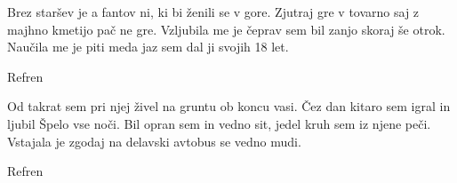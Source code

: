 

    \beginverse\baselineskip=15pt
        Brez staršev je a fantov ni, ki bi ženili se v gore.
        Zjutraj gre v tovarno saj z majhno kmetijo pač ne gre.
        Vzljubila me je čeprav sem bil zanjo skoraj še otrok.
        Naučila me je piti meda jaz sem dal ji svojih 18 let.
    \endverse

    \beginchorus\baselineskip=14pt
        Refren
    \endchorus


    \beginverse\baselineskip=15pt
        Od takrat sem pri njej živel na gruntu ob koncu vasi.
        Čez dan kitaro sem igral in ljubil Špelo vse noči.
        Bil opran sem in vedno sit, jedel kruh sem iz njene peči.
        Vstajala je zgodaj na delavski avtobus se vedno mudi.
    \endverse

    \beginchorus\baselineskip=14pt
        Refren
    \endchorus


\]\]\]\]\]\]\]\]\]\]\]\]\]\]\]\]\]\]\]\]\]\]\]\]\]\]\]\]\]\]\]\]\]\]\]\]\]\]\]\]\]\]\]\]\]\]\]\]\]\]\]\]\]\]\]\]\]\]\]\]\]\]\]\]\]\]\]\]\]\]\]\]\]\]\]\]\]\]\]\]\]\]\]\]\]\]\]\]\]\]\]\]\]\]\]\]\]\]\]\]\]\]\]\]\]\]\]\]\]\]\]\]\]\]\]\]\]\]\]\]\]\]\]\]\]\]\]\]\]\]\]\]\]\]\]\]\]\]\]\]\]\]\]\]\]\]\]\]\]\]\]\]\]\]\]\]\]\]\]\]\]\]\]\]\]\]\]\]\]\]\]\]\]\]\]\]\]\]\]\]\]\]\]\]\]\]\]\]\]\]\]\]\]\]\]\]\]\]\]\]\]\]\]\]\]\]\]\]\]\]\]\]\]\]\]\]\]\]\]\]\]\]\]\]\]\]\]\]\]\]\]\]\]\]\]\]\]\]\]\]\]\]\]\]\]\]\]\]\]\]\]\]\]\]\]\]\]\]\]\]\]\]\]\]\]\]\]\]\]\]\]\]\]\]\]\]\]\]\]\]\]\]\]\]\]\]\]\]\]\]\]\]\]\]\]\]\]\]\]\]\]\]\]\]\]\]\]\]\]\]\]\]\]\]\]\]\]\]\]\]\]\]\]\]\]\]\]\]\]\]\]\]\]\]\]\]\]\]\]\]\]\]\]\]\]\]\]\]\]\]\]\]\]\]\]\]\]\]\]\]\]\]\]\]\]\]\]\]\]\]\]\]\]\]\]\]\]\]\]\]\]\]\]\]\]\]\]\]\]\]\]\]\]\]\]\]\]\]\]\]\]\]\]\]\]\]\]\]\]\]\]\]\]\]\]\]\]\]\]\]\]\]\]\]\]\]\]\]\]\]\]\]\]\]\]\]\]\]\]\]\]\]\]\]\]\]\]\]\]\]\]\]\]\]\]\]\]\]\]\]\]\]\]\]\]\]\]\]\]\]\]\]\]\]\]\]\]\]\]\]\]\]\]\]\]\]\]\]\]\]\]\]\]\]\]\]\]\]\]\]\]\]\]\]\]\]\]\]\]\]\]\]\]\]\]\]\]\]\]\]\]\]\]\]\]\]\]\]\]\]\]\]\]\]\]\]\]\]\]\]\]\]\]\]\]\]\]\]\]\]\]\]\]\]\]\]\]\]\]\]\]\]\]\]\]\]\]\]\]\]\]\]\]\]\]\]\]\]\]\]\]\]\]\]\]\]\]\]\]\]\]\]\]\]\]\]\]\]\]\]\]\]\]\]\]\]\]\]\]\]\]\]\]\]\]\]\]\]\]\]\]\]\]\]\]\]\]\]\]\]\]\]\]\]\]\]\]\]\]\]\]\]\]\]\]\]\]\]\]\]\]\]\]\]\]\]\]\]\]\]\]\]\]\]\]\]\]\]\]\]\]\]\]\]\]\]\]\]\]\]\]\]\]\]\]\]\]\]\]\]\]\]\]\]\]\]\]\]\]\]\]\]\]\]\]\]\]\]\]\]\]\]\]\]\]\]\]\]\]\]\]\]\]\]\]\]\]\]\]\]\]\]\]\]\]\]\]\]\]\]\]\]\]\]\]\]\]\]\]\]\]\]\]\]\]\]\]\]\]\]\]\]\]\]\]\]\]\]\]\]\]\]\]\]\]\]\]\]\]\]\]\]\]\]\]\]\]\]\]\]\]\]\]\]\]\]\]\]\]\]\]\]\]\]\]\]\]\]\]\]\]\]\]\]\]\]\]\]\]\]\]\]\]\]\]\]\]\]\]\]\]\]\]\]\]\]\]\]\]\]\]\]\]\]\]\]\]\]\]\]\]\]\]\]\]\]\]\]\]\]\]\]\]\]\]\]\]\]\]\]\]\]\]\]\]\]\]\]\]\]\]\]\]\]\]\]\]\]\]\]\]\]\]\]\]\]\]\]\]\]\]\]\]\]\]\]\]\]\]\]\]\]\]\]\]\]\]\]\]\]\]\]\]\]\]\]\]\]\]\]\]\]\]\]\]\]\]\]\]\]\]\]\]\]\]\]\]\]\]\]\]\]\]\]\]\]\]\]\]\]\]\]\]\]\]\]\]\]\]\]\]\]\]\]\]\]\]\]\]\]\]\]\]\]\]\]\]\]\]\]\]\]\]\]\]\]\]\]\]\]\]\]\]\]\]\]\]\]\]\]\]\]\]\]\]\]\]\]\]\]\]\]\]\]\]\]\]\]\]\]\]\]\]\]\]\]\]\]\]\]\]\]\]\]\]\]\]\]\]\]\]\]\]\]\]\]\]\]\]\]\]\]\]\]\]\]\]\]\]\]\]\]\]\]\]\]\]\]\]\]\]\]\]\]\]\]\]\]\]\]\]\]\]\]\]\]\]\]\]\]\]\]\]\]\]\]\]\]\]\]\]\]\]\]\]\]\]\]\]\]\]\]\]\]\]\]\]\]\]\]\]\]\]\]\]\]\]\]\]\]\]\]\]\]\]\]\]\]\]\]\]\]\]\]\]\]\]\]\]\]\]\]\]\]\]\]\]\]\]\]\]\]\]\]\]\]\]\]\]\]\]\]\]\]\]\]\]\]\]\]\]\]\]\]\]\]\]\]\]\]\]\]\]\]\]\]\]\]\]\]\]\]\]\]\]
